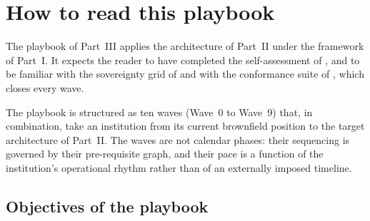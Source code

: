 
\chapter{How to read this playbook}
\label{ch:playbook-reading}

\begin{caveatbox}[Dependencies]
\noindent The playbook of Part~III applies the architecture of
Part~II under the framework of Part~I. It expects the reader to
have completed the self-assessment of ,
and to be familiar with the sovereignty grid of
 and with the conformance suite of
, which closes every wave.
\end{caveatbox}

The playbook is structured as ten waves (Wave~0 to Wave~9) that, in
combination, take an institution from its current brownfield
position to the target architecture of Part~II. The waves are not
calendar phases: their sequencing is governed by their pre-requisite
graph, and their pace is a function of the institution's
operational rhythm rather than of an externally imposed timeline.

\section{Objectives of the playbook}
\label{sec:pr-objectives}

